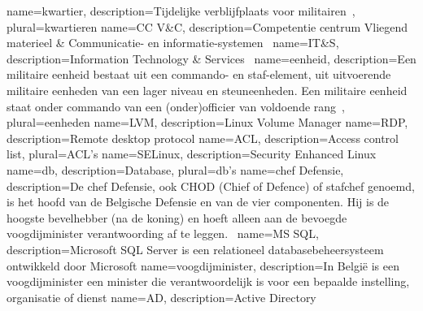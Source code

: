 \makeglossaries
{}
{
    name=kwartier,
    description={Tijdelijke verblijfplaats voor militairen~\autocite{Wikipedia2021}},
    plural=kwartieren
}
{
    name={CC V\&C},
    description={Competentie centrum Vliegend materieel \& Communicatie- en informatie-systemen~\autocite{Defensie2022a}}
}
{
    name=IT\&S,
    description={Information Technology \& Services~\autocite{Defensie2022a}}
}
{
    name=eenheid,
    description={Een militaire eenheid bestaat uit een commando- en staf-element, uit uitvoerende militaire eenheden van een lager niveau en steuneenheden. Een militaire eenheid staat onder commando van een (onder)officier van voldoende rang~\autocite{Wikipedia2021a}},
    plural=eenheden
}
{
    name=LVM,
    description={Linux Volume Manager}
}
{
    name=RDP,
    description={Remote desktop protocol}
}
{
    name=ACL,
    description={Access control list},
    plural={ACL's}
}
{
    name=SELinux,
    description={Security Enhanced Linux}
}
{
    name=db,
    description={Database},
    plural=db's
}
{
    name=chef Defensie,
    description={De chef Defensie, ook CHOD (Chief of Defence) of stafchef genoemd, is het hoofd van de Belgische Defensie en van de vier componenten. Hij is de hoogste bevelhebber (na de koning) en hoeft alleen aan de bevoegde \gls{voogdijminister} verantwoording af te leggen.~\autocite{Wikipedia2021b}}
}
{
    name={MS SQL},
    description={Microsoft SQL Server is een relationeel databasebeheersysteem ontwikkeld door Microsoft}
}
{
    name={voogdijminister},
    description={In België is een voogdijminister een minister die verantwoordelijk is voor een bepaalde instelling, organisatie of dienst}
}
{
    name={AD},
    description={Active Directory}
}